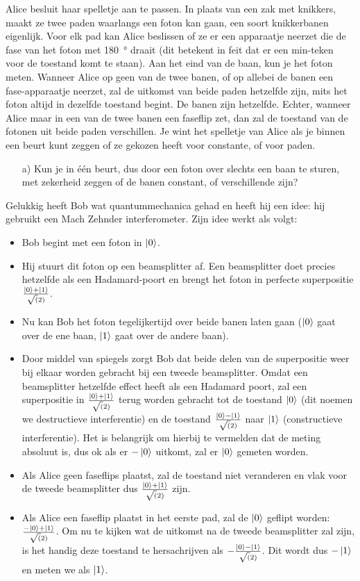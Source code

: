\documentclass[../../main.tex]{subfiles}
\begin{document}
Alice besluit haar spelletje aan te passen. In plaats van een zak met knikkers, maakt ze twee paden waarlangs een foton kan gaan, een soort knikkerbanen eigenlijk. Voor elk pad kan Alice beslissen of ze er een apparaatje neerzet die de fase van het foton met \SI{180}{\degree} draait (dit betekent in feit dat er een min-teken voor de toestand komt te staan). Aan het eind van de baan, kun je het foton meten. Wanneer Alice op geen van de twee banen, of op allebei de banen een fase-apparaatje neerzet, zal de uitkomst van beide paden hetzelfde zijn, mits het foton altijd in dezelfde toestand begint. De banen zijn hetzelfde. Echter, wanneer Alice maar in een van de twee banen een faseflip zet,  dan zal de toestand van de fotonen uit beide paden verschillen. Je wint het spelletje van Alice als je binnen een beurt kunt zeggen of ze gekozen heeft voor constante, of voor paden.

\begin{enumerate}
\item[a)] Kun je in \'e\'en beurt, dus door een foton over slechts een baan te sturen, met zekerheid zeggen of de banen constant, of verschillende zijn?
\end{enumerate}

Gelukkig heeft Bob wat quantummechanica gehad en heeft hij een idee: hij gebruikt een Mach Zehnder interferometer. Zijn idee werkt als volgt:

\begin{itemize}
\item Bob begint met een foton in $\ket{0}$.
\item Hij stuurt dit foton op een beamsplitter af. Een beamsplitter doet precies hetzelfde als een Hadamard-poort en brengt het foton in perfecte superpositie $\frac{\ket{0}+\ket{1}}{\sqrt(2)}$.
\item Nu kan Bob het foton tegelijkertijd over beide banen laten gaan ($\ket{0}$ gaat over de ene baan, $\ket{1}$ gaat over de andere baan).
\item Door middel van spiegels zorgt Bob dat beide delen van de superpositie weer bij elkaar worden gebracht bij een tweede beamsplitter. Omdat een beamsplitter hetzelfde effect heeft als een Hadamard poort, zal een superpositie in $\frac{\ket{0}+\ket{1}}{\sqrt(2)}$ terug worden gebracht tot de toestand $\ket{0}$ (dit noemen we destructieve interferentie) en de toestand $\frac{\ket{0}-\ket{1}}{\sqrt(2)}$ naar $\ket{1}$ (constructieve interferentie). Het is belangrijk om hierbij te vermelden dat de meting absoluut is, dus ok als er $-\ket{0}$ uitkomt, zal er $\ket{0}$ gemeten worden.
\item Als Alice geen faseflips plaatst, zal de toestand niet veranderen en vlak voor de tweede beamsplitter dus $\frac{\ket{0}+\ket{1}}{\sqrt(2)}$ zijn. 
\item Als Alice een faseflip plaatst in het eerste pad, zal de $\ket{0}$ geflipt worden: $\frac{-\ket{0}+\ket{1}}{\sqrt(2)}$. Om nu te kijken wat de uitkomst na de tweede beamsplitter zal zijn, is het handig deze toestand te hersachrijven als  $-\frac{\ket{0}-\ket{1}}{\sqrt(2)}$. Dit wordt dus $-\ket{1}$ en meten we als $\ket{1}$.

\end{itemize}
\end{document}
